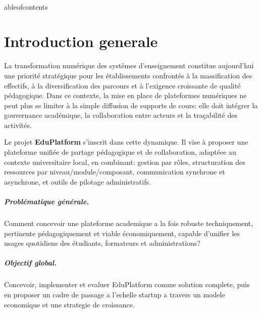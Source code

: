 ﻿﻿\documentclass[12pt,a4paper,oneside]{report}
\begin{document}
	ableofcontents
\clearpage
\listoffigures
\clearpage
\listoftables
\clearpage

\setcounter{page}{1}


\chapter*{Introduction generale}

La transformation numérique des systèmes d'enseignement constitue aujourd'hui une priorité stratégique pour les établissements confrontés à la massification des effectifs, à la diversification des parcours et à l'exigence croissante de qualité pédagogique. Dans ce contexte, la mise en place de plateformes numériques ne peut plus se limiter à la simple diffusion de supports de cours: elle doit intégrer la gouvernance académique, la collaboration entre acteurs et la traçabilité des activités.

Le projet \textbf{EduPlatform} s'inscrit dans cette dynamique. Il vise à proposer une plateforme unifiée de partage pédagogique et de collaboration, adaptéee au contexte universitaire local, en combinant: gestion par rôles, structuration des ressources par niveau/module/composant, communication synchrone et asynchrone, et outils de pilotage administratifs.

\paragraph{Problématique générale.}
Comment concevoir une plateforme academique a la fois robuste techniquement, pertinente pédagogiquement et viable économiquement, capable d'unifier les usages quotidiens des étudiants, formateurs et administrations?

\paragraph{Objectif global.}
Concevoir, implementer et evaluer EduPlatform comme solution complete, puis en proposer un cadre de passage a l'echelle startup a travers un modele economique et une strategie de croissance.
\end{document}
